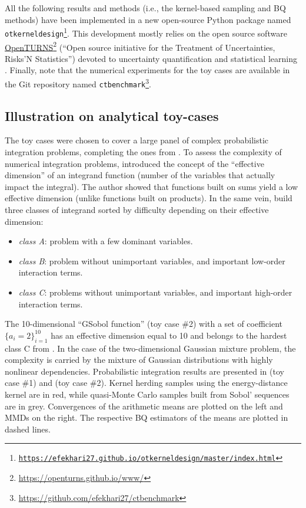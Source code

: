 All the following results and methods (i.e., the kernel-based sampling and BQ methods) have been implemented in a new open-source Python package named \texttt{otkerneldesign\footnote{\href{https://efekhari27.github.io/otkerneldesign/master/index.html}{https://efekhari27.github.io/otkerneldesign/master/index.html}}}. 
This development mostly relies on the open source software \href{https://openturns.github.io/www/}{OpenTURNS}\footnote{\url{https://openturns.github.io/www/}} (``Open source initiative for the Treatment of Uncertainties, Risks'N Statistics'') devoted to uncertainty quantification and statistical learning \citep{baudin_dutfoy_2017}. 
Finally, note that the numerical experiments for the toy cases are available in the Git repository named \texttt{ctbenchmark}\footnote{\href{https://github.com/efekhari27/ctbenchmark}{https://github.com/efekhari27/ctbenchmark}}. 


\subsection{Illustration on analytical toy-cases}
The toy cases were chosen to cover a large panel of complex probabilistic integration problems, completing the ones from \cite{fekhari_renew_2022}.
To assess the complexity of numerical integration problems, \cite{owen_2003} introduced the concept of the ``effective dimension'' of an integrand function (number of the variables that actually impact the integral). 
The author showed that functions built on sums yield a low effective dimension (unlike functions built on products). 
In the same vein, \cite{kucherenko_feil_2011} build three classes of integrand sorted by difficulty depending on their effective dimension: \begin{itemize}
    \item \emph{class A}: problem with a few dominant variables.
    \item \emph{class B}: problem without unimportant variables, and important low-order interaction terms.
    \item \emph{class C}: problems without unimportant variables, and important high-order interaction terms. 
\end{itemize}
The 10-dimensional ``GSobol function'' (toy case \#2) with a set of coefficient $\{a_i=2\}_{i=1}^{10}$ has an effective dimension equal to 10 and belongs to the hardest class C from \cite{kucherenko_feil_2011}. 
In the case of the two-dimensional Gaussian mixture problem, the complexity is carried by the mixture of Gaussian distributions with highly nonlinear dependencies.
Probabilistic integration results are presented in  (toy case \#1) and  (toy case \#2). 
Kernel herding samples using the energy-distance kernel are in red, while quasi-Monte Carlo samples built from Sobol' sequences are in grey. 
Convergences of the arithmetic means are plotted on the left and MMDs on the right. 
The respective BQ estimators of the means are plotted in dashed lines. 

